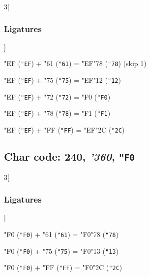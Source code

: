 \documentclass{article}
\newlength{\maxcharwidth}
\begin{document}
\begin{multicols}{3}[\subsubsection{Ligatures}]

{\testfont\char"EF\noboundary} ({\tt"EF}) + {\testfont\char"61\noboundary} ({\tt"61}) = {\testfont\char"EF\noboundary}{\testfont\char"78\noboundary} ({\tt"78})  (skip 1)

{\testfont\char"EF\noboundary} ({\tt"EF}) + {\testfont\char"75\noboundary} ({\tt"75}) = {\testfont\char"EF\noboundary}{\testfont\char"12\noboundary} ({\tt"12}) 

{\testfont\char"EF\noboundary} ({\tt"EF}) + {\testfont\char"72\noboundary} ({\tt"72}) = {\testfont\char"F0\noboundary} ({\tt"F0}) 

{\testfont\char"EF\noboundary} ({\tt"EF}) + {\testfont\char"78\noboundary} ({\tt"78}) = {\testfont\char"F1\noboundary} ({\tt"F1}) 

{\testfont\char"EF\noboundary} ({\tt"EF}) + {\testfont\char"FF\noboundary} ({\tt"FF}) = {\testfont\char"EF\noboundary}{\testfont\char"2C\noboundary} ({\tt"2C}) 

\end{multicols}

\subsection{Char code: 240, {\it'360}, {\tt"F0}}
\label{char_240}


\begin{multicols}{3}[\subsubsection{Ligatures}]

{\testfont\char"F0\noboundary} ({\tt"F0}) + {\testfont\char"61\noboundary} ({\tt"61}) = {\testfont\char"F0\noboundary}{\testfont\char"78\noboundary} ({\tt"78}) 

{\testfont\char"F0\noboundary} ({\tt"F0}) + {\testfont\char"75\noboundary} ({\tt"75}) = {\testfont\char"F0\noboundary}{\testfont\char"13\noboundary} ({\tt"13}) 

{\testfont\char"F0\noboundary} ({\tt"F0}) + {\testfont\char"FF\noboundary} ({\tt"FF}) = {\testfont\char"F0\noboundary}{\testfont\char"2C\noboundary} ({\tt"2C}) 

\end{multicols}
\end{document}
